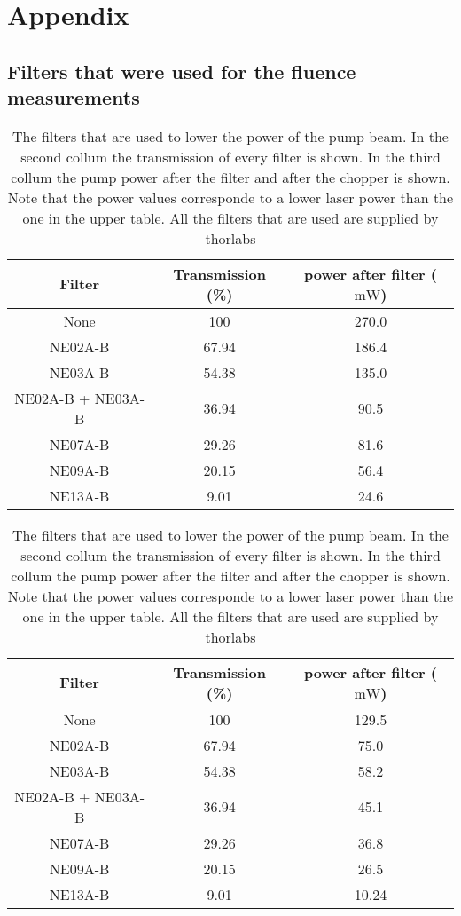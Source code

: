 \chapter{Appendix}
\label{sec:appendix}
\section{Filters that were used for the fluence measurements}
\begin{table}
    \centering
    \begin{tabular}{ccc}
        \toprule
        Filter & Transmission (\%)  & power after filter ($\si{\milli\watt}$) \\
        \midrule
        None & 100 & 270.0 \\
        NE02A-B & 67.94 &  186.4 \\
        NE03A-B & 54.38 & 135.0  \\
        NE02A-B + NE03A-B & 36.94 & 90.5 \\
        NE07A-B & 29.26 & 81.6 \\
        NE09A-B & 20.15 & 56.4 \\
        NE13A-B & 9.01 & 24.6 \\
        \bottomrule
    \end{tabular} 
    \caption{The filters that are used to lower the power of the pump beam. In the second collum, the transmission of every filter is shown. In the third collum, the pump power after the filter and after the chopper is shown.
    Note that the power values corresponding to the highest laser power that is available with the given setup. Measurements with lower initial laser power are also taken. All the filters that are used were bought from Thorlabs \cite{thorlabs}.}
    \begin{tabular}{ccc}
        \toprule
        Filter & Transmission (\%)  & power after filter ($\si{\milli\watt}$) \\
        \midrule
        None & 100 & 129.5 \\
        NE02A-B & 67.94 &  75.0 \\
        NE03A-B & 54.38 & 58.2  \\
        NE02A-B + NE03A-B & 36.94 & 45.1 \\
        NE07A-B & 29.26 & 36.8 \\
        NE09A-B & 20.15 & 26.5 \\
        NE13A-B & 9.01 & 10.24\\
        \bottomrule
    \end{tabular} 
    \caption{The filters that are used to lower the power of the pump beam. In the second collum the transmission of every filter is shown. In the third collum the pump power after the filter and after the chopper is shown.
    Note that the power values corresponde to a lower laser power than the one in the upper table. All the filters that are used are supplied by thorlabs \cite{thorlabs}}
    \label{tab:filters}
\end{table}

